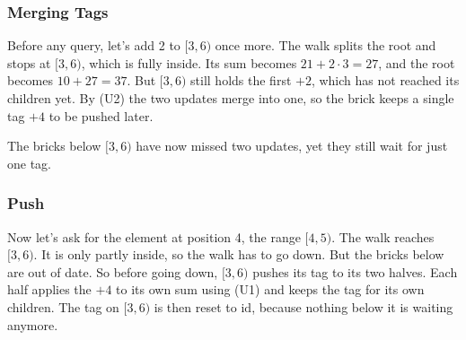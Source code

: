 \subsubsection{Merging Tags}
Before any query, let's add 2 to \([3, 6)\) once more. The walk splits the root and stops at \([3, 6)\), which is fully inside. Its sum becomes \(21 + 2 \cdot 3 = 27\), and the root becomes \(10 + 27 = 37\). But \([3, 6)\) still holds the first \(+2\), which has not reached its children yet. By \textup{(U2)} the two updates merge into one, so the brick keeps a single tag \(+4\) to be pushed later.

\begin{center}
\end{center}
The bricks below \([3, 6)\) have now missed two updates, yet they still wait for just one tag.

\subsubsection{Push}
Now let's ask for the element at position 4, the range \([4, 5)\). The walk reaches \([3, 6)\). It is only partly inside, so the walk has to go down. But the bricks below are out of date. So before going down, \([3, 6)\) pushes its tag to its two halves. Each half applies the \(+4\) to its own sum using \textup{(U1)} and keeps the tag for its own children. The tag on \([3, 6)\) is then reset to \(\mathrm{id}\), because nothing below it is waiting anymore.

